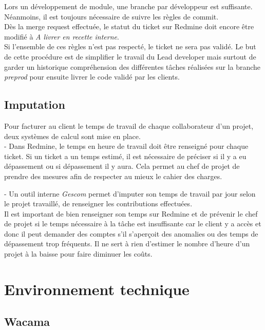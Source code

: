 \documentclass[12pt, a4paper, twoside]{report}
\begin{document}
Lors un développement de module, une branche par développeur est suffisante. Néanmoins, il est toujours nécessaire de suivre les règles de commit. \\

Dès la merge request effectuée, le statut du ticket sur Redmine doit encore être modifié à \textit{A livrer en recette interne}.  \\

Si l'ensemble de ces règles n'est pas respecté, le ticket ne sera pas validé. Le but de cette procédure est de simplifier le travail du Lead developer mais surtout de garder un historique compréhension des différentes tâches réalisées sur la branche \textit{preprod} pour ensuite livrer le code validé par les clients.

\subsection{Imputation}

Pour facturer au client le temps de travail de chaque collaborateur d'un projet, deux systèmes de calcul sont mise en place. \\

- Dans Redmine, le temps en heure de travail doit être renseigné pour chaque ticket. Si un ticket a un temps estimé, il est nécessaire de préciser si il y a eu dépassement ou si dépassement il y aura. Cela permet au chef de projet de prendre des mesures afin de respecter au mieux le cahier des charges.

- Un outil interne \textit{Gescom} permet d'imputer son temps de travail par jour selon le projet travaillé, de renseigner les contributions effectuées. \\

Il est important de bien renseigner son temps sur Redmine et de prévenir le chef de projet si le temps nécessaire à la tâche est insuffisante car le client y a accès et donc il peut demander des comptes s'il s'aperçoit des anomalies ou des temps de dépassement trop fréquents. Il ne sert à rien d'estimer le nombre d'heure d'un projet à la baisse pour faire diminuer les coûts.


\section{Environnement technique}

\subsection{Wacama}
\end{document}
